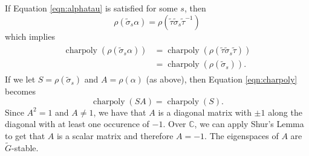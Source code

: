 \documentclass{dcthesis}
\newcommand{\CC}{\mathbb C}
\newcommand{\wt}[1]{\widetilde{#1}}
\DeclareMathOperator{\charpoly}{charpoly}
\numberwithin{equation}{section}
\theoremstyle{definition}
\theoremstyle{remark}
\begin{document}
{{    If Equation \ref{eqn:alphatau}
    is satisfied for some $s$,
    then
    \begin{equation}
      \label{eqn:rhoalphatau}
      \rho(\wt{\sigma}_s\alpha)
      =
      \rho(\wt{\tau}\wt{\sigma}_s\wt{\tau}^{-1})
    \end{equation}
    which implies
    \begin{align}
      \label{eqn:charpoly}
      \begin{split}
        \charpoly(\rho(\wt{\sigma}_s\alpha))
        &=\charpoly(\rho(\wt{\tau}\wt{\sigma}_s\wt{\tau}))\\
        &=\charpoly(\rho(\wt{\sigma}_s)).
      \end{split}
    \end{align}
    If we let $S = \rho(\wt{\sigma}_s)$
    and $A=\rho(\alpha)$ (as above),
    then Equation \ref{eqn:charpoly}
    becomes
    \begin{equation}
      \label{eqn:charpoly2}
      \charpoly(SA) = \charpoly(S).
    \end{equation}
    Since $A^2=1$ and $A\neq 1$,
    we have that $A$ is a diagonal matrix
    with $\pm 1$ along the diagonal with
    at least one occurence of $-1$.
    Over $\CC$,
    we can apply Shur's Lemma
    to get that $A$ is a scalar matrix
    and therefore $A=-1$.
    The eigenspaces of $A$ are $\wt{G}$-stable.
  }
}
\end{document}
